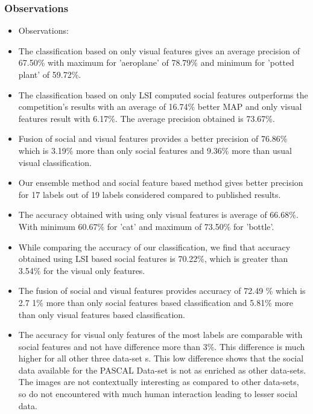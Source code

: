 \subsubsection*{Observations}


\begin{itemize}
\item Observations:

\item The classification based on only visual features gives an average precision of 67.50\% with maximum for 'aeroplane' of 78.79\% and minimum for 'potted plant' of 59.72\%.

\item The classification based on only LSI computed social features outperforms the competition's results with an average of 16.74\% better MAP and only visual features result with 6.17\%. The average precision obtained is 73.67\%.

\item Fusion of social and visual features provides a better precision of 76.86\% which is 3.19\% more than only social features and 9.36\% more than usual visual classification.

\item Our ensemble method and social feature based method gives better precision for 17 labels out of 19 labels considered compared to published results.

\item The accuracy obtained with using only visual features is average of 66.68\%. With minimum 60.67\% for 'cat' and maximum of 73.50\% for 'bottle'.

\item While comparing the accuracy of our classification, we find that accuracy obtained using LSI based social features is 70.22\%, which is greater than 3.54\% for the visual only features.

\item The fusion of social and visual features provides accuracy of 72.49 \% which is 2.7
1\% more than only social features based classification and 5.81\% more than only visual features based classification.

\item The accuracy for visual only features of the most labels are comparable with social features and not have difference more than 3\%. This difference is much higher for all other three data-set s. This low difference shows that the social data available for the PASCAL Data-set is not as enriched as other data-sets. The images are not contextually interesting as compared to other data-sets, so do not encountered with much human interaction leading to lesser social data.

\end{itemize}

